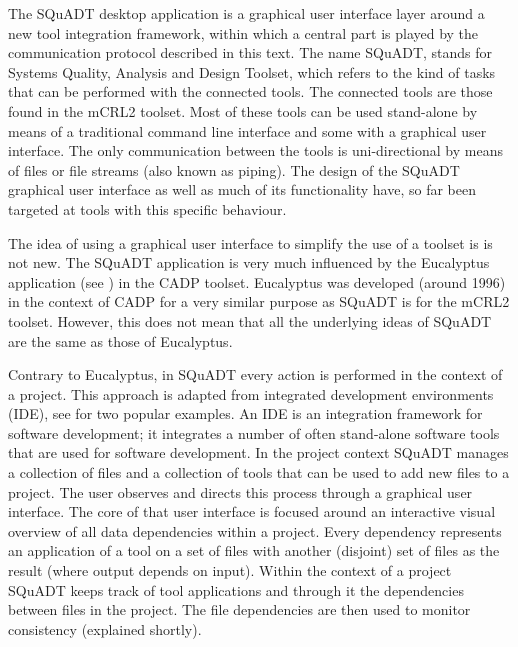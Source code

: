 \documentclass{article}
\newcommand{\squadt}{SQuADT\xspace}
\begin{document}
  The \squadt desktop application is a graphical user interface layer around a
  new tool integration framework, within which a central part is played by the
  communication protocol described in this text.  The name \squadt, stands for
  Systems Quality, Analysis and Design Toolset, which refers to the kind of
  tasks that can be performed with the connected tools. The connected tools are
  those found in the mCRL2 toolset. Most of these tools can be used
  stand-alone by means of a traditional command line interface and some with a
  graphical user interface.  The only communication between the tools is
  uni-directional by means of files or file streams (also known as piping). The
  design of the \squadt graphical user interface as well as much of its
  functionality have, so far been targeted at tools with this specific
  behaviour.
  
  The idea of using a graphical user interface to simplify the use of a toolset
  is is not new. The \squadt application is very much influenced by the
  Eucalyptus application (see \cite{CADP}) in the CADP toolset. Eucalyptus was
  developed (around 1996) in the context of CADP for a very similar purpose as
  \squadt is for the mCRL2 toolset. However, this does not mean that all the
  underlying ideas of \squadt are the same as those of Eucalyptus.
  
  
  Contrary to Eucalyptus, in \squadt every action is performed in the context
  of a project. This approach is adapted from integrated development
  environments (IDE), see \cite{Eclipse,NetBeans} for two popular examples.
  An IDE is an integration framework for software development; it integrates a
  number of often stand-alone software tools that are used for software
  development. In the project context \squadt manages a collection of files and
  a collection of tools that can be used to add new files to a project. The
  user observes and directs this process through a graphical user interface.
  The core of that user interface is focused around an interactive visual
  overview of all data dependencies within a project.  Every dependency
  represents an application of a tool on a set of files with another (disjoint)
  set of files as the result (where output depends on input).  Within the
  context of a project \squadt keeps track of tool applications and through it
  the dependencies between files in the project. The file dependencies are then
  used to monitor consistency (explained shortly).
\end{document}

